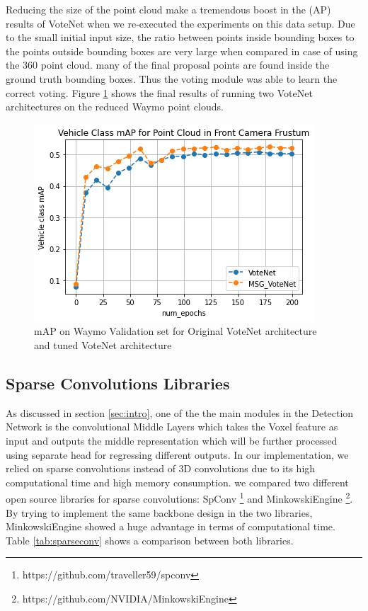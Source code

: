 \documentclass[10pt,twocolumn,letterpaper]{article}
\begin{document}
Reducing the size of the point cloud make a tremendous boost in the (AP) results of VoteNet when we re-executed the experiments on this data setup. Due to the small initial input size, the ratio between points inside bounding boxes to the points outside bounding boxes are very large when compared in case of using the 360 point cloud. many of the final proposal points are found inside the ground truth bounding boxes. Thus the voting module was able to learn the correct voting. Figure \ref{fig:votnet_front_camera_results} shows the final results of running two VoteNet architectures on the reduced Waymo point clouds.

\begin{figure}
	\includegraphics[width=\linewidth]{media/votenet_mAP.png}
   \caption{mAP on Waymo Validation set for Original VoteNet architecture and tuned VoteNet architecture}
\label{fig:votnet_front_camera_results}
\end{figure}


\subsection{Sparse Convolutions Libraries}
As discussed in section \ref{sec:intro}, one of the the main modules in the Detection Network is the convolutional Middle Layers which takes the Voxel feature as input and outputs the middle representation which will be further processed using separate head for regressing different outputs. In our implementation, we relied on sparse convolutions instead of 3D convolutions due to its high computational time and high memory consumption. we compared two different open source libraries for sparse convolutions: SpConv \footnote{https://github.com/traveller59/spconv} and MinkowskiEngine \footnote{https://github.com/NVIDIA/MinkowskiEngine}. By trying to implement the same backbone design in the two libraries, MinkowskiEngine showed a huge advantage in terms of computational time. Table \ref{tab:sparseconv} shows a comparison between both libraries.
\end{document}
